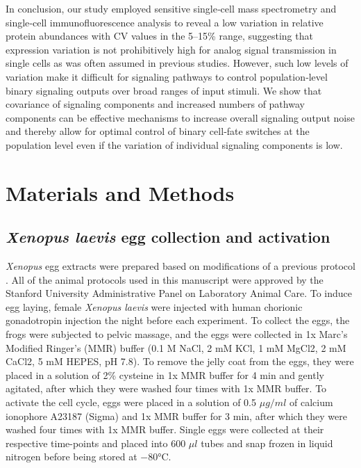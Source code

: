 In conclusion, our study employed sensitive single‐cell mass spectrometry and single‐cell immunofluorescence analysis to reveal a low variation in relative protein abundances with CV values in the 5–15\% range, suggesting that expression variation is not prohibitively high for analog signal transmission in single cells as was often assumed in previous studies. However, such low levels of variation make it difficult for signaling pathways to control population‐level binary signaling outputs over broad ranges of input stimuli. We show that covariance of signaling components and increased numbers of pathway components can be effective mechanisms to increase overall signaling output noise and thereby allow for optimal control of binary cell‐fate switches at the population level even if the variation of individual signaling components is low.

\section{Materials and Methods} \label{Materials and Methods}

\subsection{\emph{Xenopus laevis} egg collection and activation}

\emph{Xenopus} egg extracts were prepared based on modifications of a previous protocol \cite{Tsai2014}. All of the animal protocols used in this manuscript were approved by the Stanford University Administrative Panel on Laboratory Animal Care. To induce egg laying, female \emph{Xenopus laevis} were injected with human chorionic gonadotropin injection the night before each experiment. To collect the eggs, the frogs were subjected to pelvic massage, and the eggs were collected in 1x Marc's Modified Ringer's (MMR) buffer (0.1 M NaCl, 2 mM KCl, 1 mM MgCl2, 2 mM CaCl2, 5 mM HEPES, pH 7.8). To remove the jelly coat from the eggs, they were placed in a solution of 2\% cysteine in 1x MMR buffer for 4 min and gently agitated, after which they were washed four times with 1x MMR buffer. To activate the cell cycle, eggs were placed in a solution of 0.5 $\mu g/ml$ of calcium ionophore A23187 (Sigma) and 1x MMR buffer for 3 min, after which they were washed four times with 1x MMR buffer. Single eggs were collected at their respective time-points and placed into 600 $\mu l$ tubes and snap frozen in liquid nitrogen before being stored at $-80$\si{\degree}C.

